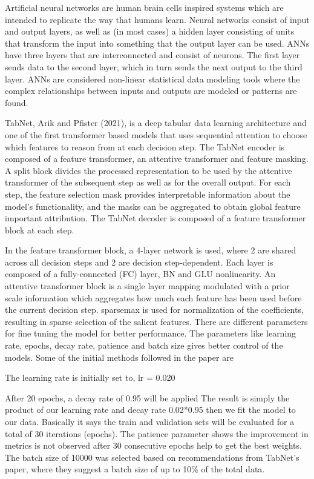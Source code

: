 \documentclass[conference,final,]{IEEEtran}
\begin{document}
Artificial neural networks are human brain cells inspired systems which
are intended to replicate the way that humans learn. Neural networks
consist of input and output layers, as well as (in most cases) a hidden
layer consisting of units that transform the input into something that
the output layer can be used. ANNs have three layers that are
interconnected and consist of neurons. The first layer sends data to the
second layer, which in turn sends the next output to the third layer.
ANNs are considered non-linear statistical data modeling tools where the
complex relationships between inputs and outputs are modeled or patterns
are found.

TabNet, Arik and Pfister (2021), is a deep tabular data learning
architecture and one of the first transformer based models that uses
sequential attention to choose which features to reason from at each
decision step. The TabNet encoder is composed of a feature transformer,
an attentive transformer and feature masking. A split block divides the
processed representation to be used by the attentive transformer of the
subsequent step as well as for the overall output. For each step, the
feature selection mask provides interpretable information about the
model's functionality, and the masks can be aggregated to obtain global
feature important attribution. The TabNet decoder is composed of a
feature transformer block at each step.

In the feature transformer block, a 4-layer network is used, where 2 are
shared across all decision steps and 2 are decision step-dependent. Each
layer is composed of a fully-connected (FC) layer, BN and GLU
nonlinearity. An attentive transformer block is a single layer mapping
modulated with a prior scale information which aggregates how much each
feature has been used before the current decision step. sparsemax is
used for normalization of the coefficients, resulting in sparse
selection of the salient features. There are different parameters for
fine tuning the model for better performance. The parameters like
learning rate, epochs, decay rate, patience and batch size gives better
control of the models. Some of the initial methods followed in the paper
are

The learning rate is initially set to, lr = 0.020

After 20 epochs, a decay rate of 0.95 will be applied The result is
simply the product of our learning rate and decay rate 0.02*0.95 then we
fit the model to our data. Basically it says the train and validation
sets will be evaluated for a total of 30 iterations (epochs). The
patience parameter shows the improvement in metrics is not observed
after 30 consecutive epochs help to get the best weights. The batch size
of 10000 was selected based on recommendations from TabNet's paper,
where they suggest a batch size of up to 10\% of the total data.
\end{document}
